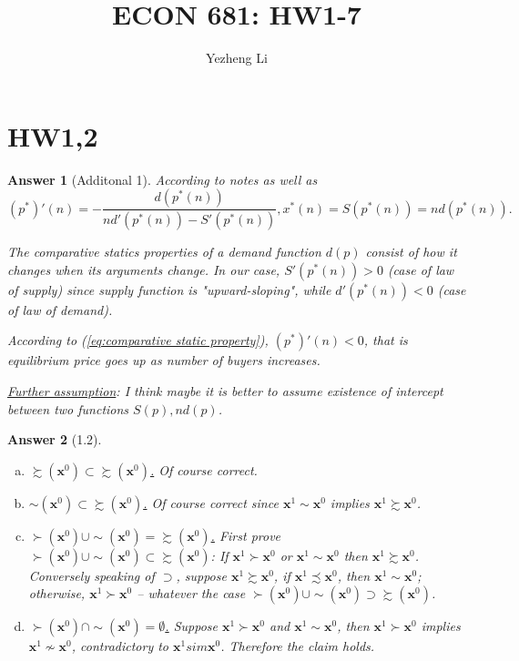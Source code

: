 \documentclass{article}
\author{Yezheng Li}
\title{ECON 681: HW1-7}
\newtheorem*{ans}{Answer}
\newcommand{\1}{{\bf 1}}
\newcommand{\cX}{\mathcal{X}}
\newcommand{\0}{{\mathbf{0}}}
\newcommand{\x}{{\mathbf{x}}}
\newcommand{\<}{\langle}
\renewcommand{\>}{\rangle}
\begin{document}
	\maketitle
	\tableofcontents
	\section{HW1,2}
	\begin{ans}[Additonal 1]
		
		According to notes as well as 
\begin{equation}
\left(p^*\right)' (n) =  - \frac{ d \left(p^* (n)\right)}{ nd' \left(p^*(n) \right) - S'\left(p^* (n) \right)}, x^*(n) = S\left(p^*(n)\right) = n d \left( p^*(n) \right).\label{eq:comparative static property}
\end{equation}

The comparative statics properties of a demand function $d(p)$ consist of how it changes when its arguments change. In our case, $S'\left(p^* (n) \right) >0$ (case of law of supply) since supply function is "upward-sloping", while $d'(p^*(n)) <0$ (case of law of demand).

According to (\ref{eq:comparative static property}), $\left(p^*\right)' (n) <0$, that is equilibrium price goes up as number of buyers increases.
		
		\ul{Further assumption}: I think maybe it is better to assume existence of intercept between two functions $S(p), nd(p)$.
	\end{ans}
\begin{ans}[1.2]
	\begin{enumerate}[(a)] For any $\x^0 \in \cX$,
		\item \ul{$\succsim (\x^0) \subset \succsim (\x^0)$.} Of course correct.
		\item \ul{$ \sim (\x^0) \subset \succsim (\x^0)$.} Of course correct since $\x^1 \sim \x^0$ implies $\x^1 \succsim \x^0$.
		\item \ul{$ \succ (\x^0) \cup \sim  (\x^0) = \succsim (\x^0)$.} First prove $ \succ (\x^0) \cup \sim  (\x^0) \subset \succsim (\x^0)$: If $\x^1 \succ \x^0$ or $\x^1 \sim \x^0$ then $\x^1 \succsim \x^0$. Conversely speaking of $\supset$, suppose $\x^1 \succsim \x^0$, if $\x^1 \precsim \x^0$, then $\x^1 \sim \x^0$; otherwise, $\x^1 \succ \x^0$ -- whatever the case $ \succ (\x^0) \cup \sim  (\x^0) \supset \succsim (\x^0)$.
		\item \ul{$ \succ (\x^0) \cap \sim (\x^0) = \emptyset$.} Suppose $ \x^1 \succ \x^0$ and $\x^1\sim \x^0$, then $ \x^1 \succ \x^0$ implies $ \x^1 \not \sim \x^0$, contradictory to $ \x^1 sim \x^0$. Therefore the claim holds.
	\end{enumerate}
\end{ans}
\end{document}
